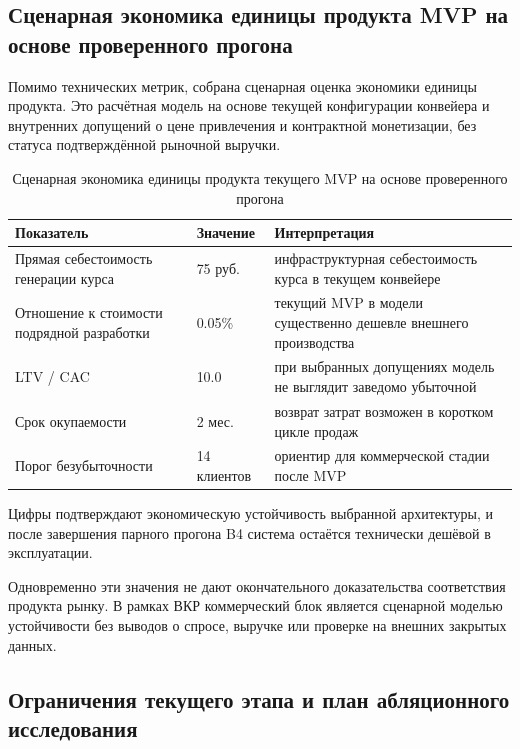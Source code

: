 \subsection[Сценарная экономика единицы продукта MVP]{Сценарная экономика единицы продукта MVP на основе проверенного прогона}

Помимо технических метрик, собрана сценарная оценка
экономики единицы продукта. Это расчётная модель на основе текущей конфигурации
конвейера и внутренних допущений о цене привлечения и контрактной
монетизации, без статуса подтверждённой рыночной выручки.

\begin{table}[H]
  \caption{Сценарная экономика единицы продукта текущего MVP на основе проверенного прогона}
  \label{tab:unitecon}
  \centering
  \begin{tabular}{|P{6.0cm}|P{3.0cm}|P{4.5cm}|}
  \hline
  \textbf{Показатель}
    & \textbf{Значение}
    & \textbf{Интерпретация} \\
  \hline
  Прямая себестоимость генерации курса
    & 75 руб.
    & инфраструктурная себестоимость курса в текущем конвейере \\
  \hline
  Отношение к стоимости подрядной разработки
    & 0.05\%
    & текущий MVP в модели существенно дешевле внешнего производства \\
  \hline
  LTV / CAC
    & 10.0
    & при выбранных допущениях модель не выглядит заведомо убыточной \\
  \hline
  Срок окупаемости
    & 2 мес.
    & возврат затрат возможен в коротком цикле продаж \\
  \hline
  Порог безубыточности
    & 14 клиентов
    & ориентир для коммерческой стадии после MVP \\
  \hline
  \end{tabular}
\end{table}

Цифры подтверждают экономическую устойчивость выбранной архитектуры,
и после завершения парного прогона B4 система остаётся технически дешёвой
в эксплуатации.

Одновременно эти значения не дают окончательного
доказательства соответствия продукта рынку. В рамках ВКР коммерческий блок является
сценарной моделью устойчивости без выводов о спросе, выручке или
проверке на внешних закрытых данных.

\subsection[Ограничения этапа и план исследования]{Ограничения текущего этапа и план абляционного исследования}

